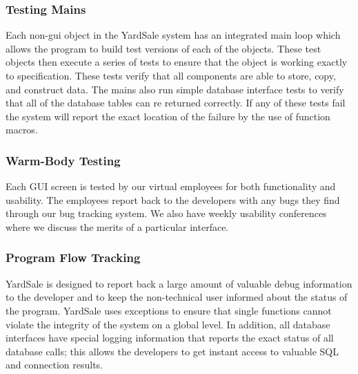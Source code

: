 \documentclass{report}
\begin{document}
        \subsubsection{Testing Mains}
        Each non-gui object in the YardSale system has an integrated main loop which allows the program to build test versions of
        each of the objects.  These test objects then execute a series of tests to ensure that the object is working exactly to specification.  These tests verify that all components are able to store, copy, and construct data.  The mains also run simple database interface tests to verify that all of the database tables can re returned correctly.
        If any of these tests fail the system will report the exact location of the failure by the use of function macros.

        \subsubsection{Warm-Body Testing}
        Each GUI screen is tested by our virtual employees for both functionality and usability.  The employees report back to the developers with any
        bugs they find through our bug tracking system.  We also have weekly usability conferences where we discuss the merits of a particular interface.

        \subsubsection{Program Flow Tracking}
        YardSale is designed to report back a large amount of valuable debug information to the developer and to keep the non-technical user
        informed about the status of the program.  YardSale uses exceptions to ensure that single functions cannot violate the integrity of the system
        on a global level.  In addition, all database interfaces have special logging information that reports the exact status of all database calls; this
        allows the developers to get instant access to valuable SQL and connection results.
\end{document}
